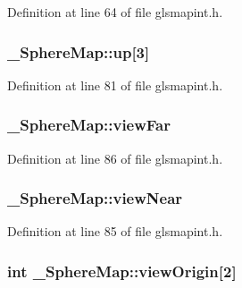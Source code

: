 Definition at line 64 of file glsmapint.\-h.

\hypertarget{struct___sphere_map_aad20bb4c305d5d233926bd385dc156c5}{
\subsubsection[{up}]{ \-\_\-\-Sphere\-Map\-::up\mbox{[}3\mbox{]}}}\label{struct___sphere_map_aad20bb4c305d5d233926bd385dc156c5}


Definition at line 81 of file glsmapint.\-h.

\hypertarget{struct___sphere_map_ac3aa620d297a12e05e6005800512a102}{
\subsubsection[{view\-Far}]{ \-\_\-\-Sphere\-Map\-::view\-Far}}\label{struct___sphere_map_ac3aa620d297a12e05e6005800512a102}


Definition at line 86 of file glsmapint.\-h.

\hypertarget{struct___sphere_map_a421e9bbe724d01a01faf291e6c445c6b}{
\subsubsection[{view\-Near}]{ \-\_\-\-Sphere\-Map\-::view\-Near}}\label{struct___sphere_map_a421e9bbe724d01a01faf291e6c445c6b}


Definition at line 85 of file glsmapint.\-h.

\hypertarget{struct___sphere_map_ae062a12b748d07b243a06554485da9ce}{
\subsubsection[{view\-Origin}]{\setlength{\rightskip}{0pt plus 5cm}int \-\_\-\-Sphere\-Map\-::view\-Origin\mbox{[}2\mbox{]}}}\label{struct___sphere_map_ae062a12b748d07b243a06554485da9ce}


